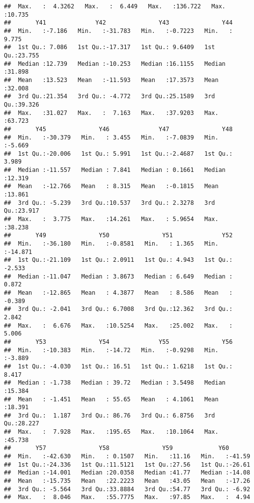 \documentclass[
]{article}
\begin{document}
\begin{verbatim}
##  Max.   :  4.3262   Max.   :  6.449   Max.   :136.722   Max.   :10.735  
##       Y41              Y42               Y43               Y44        
##  Min.   :-7.186   Min.   :-31.783   Min.   :-0.7223   Min.   : 9.775  
##  1st Qu.: 7.086   1st Qu.:-17.317   1st Qu.: 9.6409   1st Qu.:23.755  
##  Median :12.739   Median :-10.253   Median :16.1155   Median :31.898  
##  Mean   :13.523   Mean   :-11.593   Mean   :17.3573   Mean   :32.008  
##  3rd Qu.:21.354   3rd Qu.: -4.772   3rd Qu.:25.1589   3rd Qu.:39.326  
##  Max.   :31.027   Max.   :  7.163   Max.   :37.9203   Max.   :63.723  
##       Y45               Y46              Y47               Y48        
##  Min.   :-30.379   Min.   : 3.455   Min.   :-7.0839   Min.   :-5.669  
##  1st Qu.:-20.006   1st Qu.: 5.991   1st Qu.:-2.4687   1st Qu.: 3.989  
##  Median :-11.557   Median : 7.841   Median : 0.1661   Median :12.319  
##  Mean   :-12.766   Mean   : 8.315   Mean   :-0.1815   Mean   :13.861  
##  3rd Qu.: -5.239   3rd Qu.:10.537   3rd Qu.: 2.3278   3rd Qu.:23.917  
##  Max.   :  3.775   Max.   :14.261   Max.   : 5.9654   Max.   :38.238  
##       Y49               Y50               Y51              Y52         
##  Min.   :-36.180   Min.   :-0.8581   Min.   : 1.365   Min.   :-14.871  
##  1st Qu.:-21.109   1st Qu.: 2.0911   1st Qu.: 4.943   1st Qu.: -2.533  
##  Median :-11.047   Median : 3.8673   Median : 6.649   Median :  0.872  
##  Mean   :-12.865   Mean   : 4.3877   Mean   : 8.586   Mean   : -0.389  
##  3rd Qu.: -2.041   3rd Qu.: 6.7008   3rd Qu.:12.362   3rd Qu.:  2.842  
##  Max.   :  6.676   Max.   :10.5254   Max.   :25.002   Max.   :  5.006  
##       Y53               Y54              Y55               Y56        
##  Min.   :-10.383   Min.   :-14.72   Min.   :-0.9298   Min.   :-3.889  
##  1st Qu.: -4.030   1st Qu.: 16.51   1st Qu.: 1.6218   1st Qu.: 8.417  
##  Median : -1.738   Median : 39.72   Median : 3.5498   Median :15.384  
##  Mean   : -1.451   Mean   : 55.65   Mean   : 4.1061   Mean   :18.391  
##  3rd Qu.:  1.187   3rd Qu.: 86.76   3rd Qu.: 6.8756   3rd Qu.:28.227  
##  Max.   :  7.928   Max.   :195.65   Max.   :10.1064   Max.   :45.738  
##       Y57               Y58               Y59             Y60        
##  Min.   :-42.630   Min.   : 0.1507   Min.   :11.16   Min.   :-41.59  
##  1st Qu.:-24.336   1st Qu.:11.5121   1st Qu.:27.56   1st Qu.:-26.61  
##  Median :-14.001   Median :20.0358   Median :41.77   Median :-14.08  
##  Mean   :-15.735   Mean   :22.2223   Mean   :43.05   Mean   :-17.26  
##  3rd Qu.: -5.564   3rd Qu.:33.8884   3rd Qu.:54.77   3rd Qu.: -6.92  
##  Max.   :  8.046   Max.   :55.7775   Max.   :97.85   Max.   :  4.94  

\end{verbatim}
\end{document}
